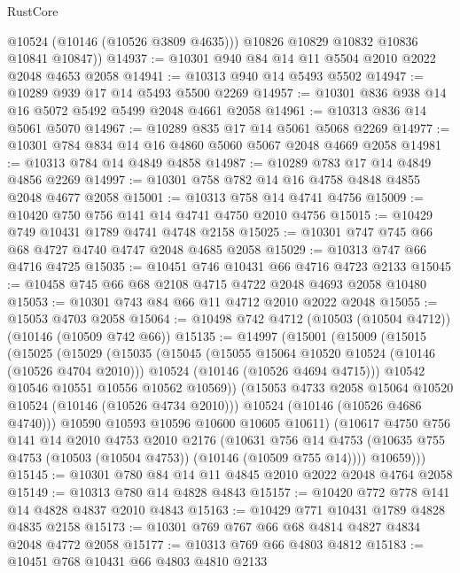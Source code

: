 \begin{lexlean}{RustCore}
\begin{coremodule}
          @10524
          (@10146 (@10526 @3809 @4635)))
        @10826
        @10829
        @10832
        @10836
        @10841
        @10847))
@14937 := @10301 @940 @84 @14 @11 @5504 @2010 @2022 @2048 @4653 @2058
@14941 := @10313 @940 @14 @5493 @5502
@14947 := @10289 @939 @17 @14 @5493 @5500 @2269
@14957 := @10301 @836 @938 @14 @16 @5072 @5492 @5499 @2048 @4661 @2058
@14961 := @10313 @836 @14 @5061 @5070
@14967 := @10289 @835 @17 @14 @5061 @5068 @2269
@14977 := @10301 @784 @834 @14 @16 @4860 @5060 @5067 @2048 @4669 @2058
@14981 := @10313 @784 @14 @4849 @4858
@14987 := @10289 @783 @17 @14 @4849 @4856 @2269
@14997 := @10301 @758 @782 @14 @16 @4758 @4848 @4855 @2048 @4677 @2058
@15001 := @10313 @758 @14 @4741 @4756
@15009 := @10420 @750 @756 @141 @14 @4741 @4750 @2010 @4756
@15015 := @10429 @749 @10431 @1789 @4741 @4748 @2158
@15025 := @10301 @747 @745 @66 @68 @4727 @4740 @4747 @2048 @4685 @2058
@15029 := @10313 @747 @66 @4716 @4725
@15035 := @10451 @746 @10431 @66 @4716 @4723 @2133
@15045 := @10458 @745 @66 @68 @2108 @4715 @4722 @2048 @4693 @2058 @10480
@15053 := @10301 @743 @84 @66 @11 @4712 @2010 @2022 @2048
@15055 := @15053 @4703 @2058
@15064 := @10498 @742 @4712 (@10503 (@10504 @4712)) (@10146 (@10509 @742 @66))
@15135 := @14997
    (@15001
      (@15009
        (@15015
          (@15025
            (@15029
              (@15035
                (@15045
                  (@15055 @15064 @10520 @10524 (@10146 (@10526 @4704 @2010)))
                  @10524
                  (@10146 (@10526 @4694 @4715)))
                @10542
                @10546
                @10551
                @10556
                @10562
                @10569))
            (@15053 @4733 @2058 @15064 @10520 @10524 (@10146 (@10526 @4734 @2010)))
            @10524
            (@10146 (@10526 @4686 @4740)))
          @10590
          @10593
          @10596
          @10600
          @10605
          @10611)
        (@10617
          @4750
          @756
          @141
          @14
          @2010
          @4753
          @2010
          @2176
          (@10631
            @756
            @14
            @4753
            (@10635 @755 @4753 (@10503 (@10504 @4753)) (@10146 (@10509 @755 @14))))
          @10659)))
@15145 := @10301 @780 @84 @14 @11 @4845 @2010 @2022 @2048 @4764 @2058
@15149 := @10313 @780 @14 @4828 @4843
@15157 := @10420 @772 @778 @141 @14 @4828 @4837 @2010 @4843
@15163 := @10429 @771 @10431 @1789 @4828 @4835 @2158
@15173 := @10301 @769 @767 @66 @68 @4814 @4827 @4834 @2048 @4772 @2058
@15177 := @10313 @769 @66 @4803 @4812
@15183 := @10451 @768 @10431 @66 @4803 @4810 @2133

\end{coremodule}
\end{lexlean}

